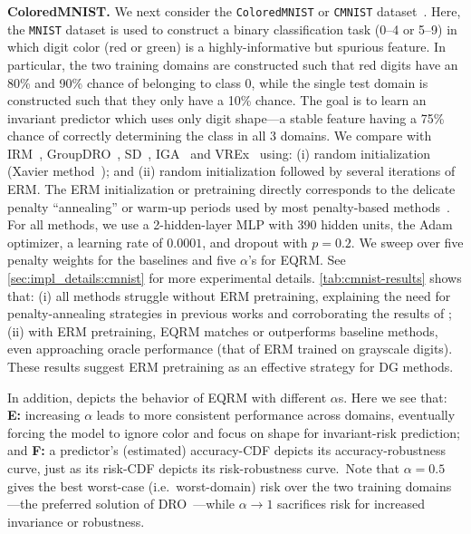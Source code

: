 \documentclass{article}
\begin{document}
\textbf{ColoredMNIST.} We next consider the \texttt{ColoredMNIST} or \texttt{CMNIST} dataset~\citep{arjovsky2020invariant}. Here, the \texttt{MNIST} dataset is used to construct a binary classification task (0--4 or 5--9) in which digit color (red or green) is a highly-informative but spurious feature. In particular, the two training domains are constructed such that red digits have an 80\% and 90\% chance of belonging to class 0, while the single test domain is constructed such that they only have a 10\% chance.
%
The goal is to learn an invariant predictor which uses only digit shape---a stable feature having a 75\% chance of correctly determining the class in all 3 domains. We compare with IRM~\citep{arjovsky2020invariant}, GroupDRO~\citep{sagawa2019distributionally}, SD~\citep{pezeshki2021gradient}, IGA~\citep{koyama2020out} and VREx~\citep{krueger21rex} using: (i) random initialization (Xavier method~\cite{glorot2010understanding}); and (ii) random initialization followed by several iterations of ERM. The ERM initialization or pretraining directly corresponds to the delicate penalty ``annealing'' or warm-up periods used by most penalty-based methods~\citep{arjovsky2020invariant, krueger21rex, pezeshki2021gradient, koyama2020out}. For all methods, we use a 2-hidden-layer MLP with 390 hidden units, the Adam optimizer, a learning rate of $0.0001$, and dropout with $p\! =\! 0.2$. We sweep over five penalty weights
%
for the baselines and five $\alpha$'s 
%
for EQRM. See \cref{sec:impl_details:cmnist} for more experimental details. \cref{tab:cmnist-results} shows that: (i) all methods struggle without ERM pretraining, explaining the need for penalty-annealing strategies in previous works and corroborating the results of \cite[Table 1]{zhang2022rich}; (ii) with ERM pretraining, EQRM matches or outperforms baseline methods, even approaching oracle performance (that of ERM trained on grayscale digits).  These results suggest ERM pretraining as an effective strategy for DG methods.
%

In addition,  depicts the behavior of EQRM with different $\alpha$s. Here we see that: \textbf{E:} increasing $\alpha$ leads to more consistent performance across domains, eventually forcing the model to ignore color and focus on shape for invariant-risk prediction; and \textbf{F:} a predictor's (estimated) accuracy-CDF depicts its accuracy-robustness curve, just as its risk-CDF depicts its risk-robustness curve.\ Note that $\alpha\! =\! 0.5$ gives the best worst-case (i.e.\ worst-domain) risk over the two training domains---the preferred solution of DRO~\citep{sagawa2019distributionally}---while $\alpha\! \to\! 1$ sacrifices risk for increased invariance or robustness.
\end{document}

